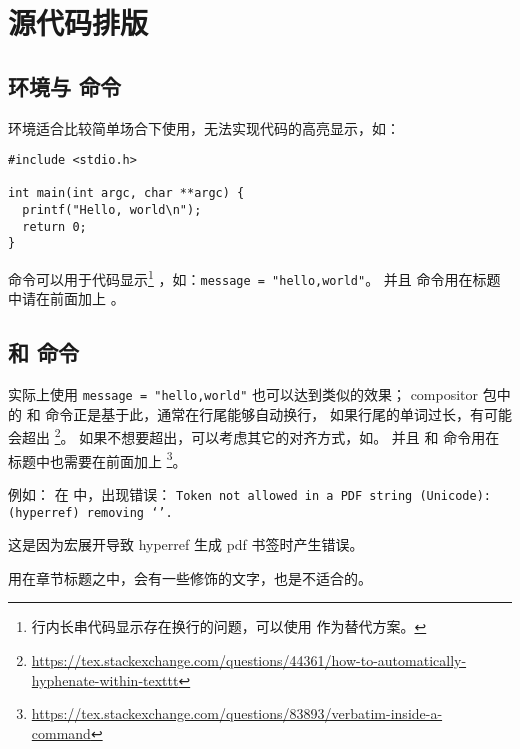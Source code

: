 \chapter{源代码排版}

\section{\protect{} 环境与 \protect{} 命令}

 环境适合比较简单场合下使用，无法实现代码的高亮显示，如：

\begin{verbatim}
#include <stdio.h>

int main(int argc, char **argc) {
  printf("Hello, world\n");
  return 0;
}
\end{verbatim}

 命令可以用于代码显示\footnote{行内长串代码显示存在换行的问题，可以使用  作为替代方案。}
，如：\texttt{\verb|message = "hello,world"|}。
并且  命令用在标题中请在前面加上 。

\section{\protect{} 和 \protect{} 命令}

实际上使用 \texttt{{\tffamily message = "hello,world"}} 也可以达到类似的效果；
compositor 包中的  和  命令正是基于此，通常在行尾能够自动换行，
如果行尾的单词过长，有可能会超出
\footnote{\url{https://tex.stackexchange.com/questions/44361/how-to-automatically-hyphenate-within-texttt}}。
如果不想要超出，可以考虑其它的对齐方式，如。
并且  和  命令用在标题中也需要在前面加上 
\footnote{\url{https://tex.stackexchange.com/questions/83893/verbatim-inside-a-command}}。

例如： 在   中，出现错误：
\texttt{Token not allowed in a PDF string (Unicode): (hyperref) removing `\new@ifnextchar'.} 

这是因为宏展开导致 hyperref 生成 pdf 书签时产生错误。

\begin{remark*}
 用在章节标题之中，会有一些修饰的文字，也是不适合的。
\end{remark*}

